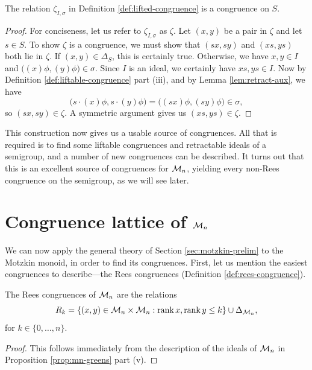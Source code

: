 \begin{theorem}
  \label{thm:lifted-congruence}
  The relation $\zeta_{I,\sigma}$ in Definition \ref{def:lifted-congruence} is a
  congruence on $S$.
  \begin{proof}
    For conciseness, let us refer to $\zeta_{I,\sigma}$ as $\zeta$.  Let $(x,y)$
    be a pair in $\zeta$ and let $s \in S$.  To show $\zeta$ is a congruence, we
    must show that $(sx,sy)$ and $(xs,ys)$ both lie in $\zeta$.  If
    $(x,y) \in \Delta_S$, this is certainly true.  Otherwise, we have
    $x, y \in I$ and $\big((x)\phi, (y)\phi\big) \in \sigma$.  Since $I$ is an
    ideal, we certainly have $xs,ys\in I$.  Now by Definition
    \ref{def:liftable-congruence} part (iii), and by Lemma
    \ref{lem:retract-aux}, we have
    $$\big(s \cdot (x)\phi, s \cdot (y)\phi\big)
    = \big((sx)\phi, (sy)\phi\big) \in \sigma,$$
    so $(sx, sy) \in \zeta$.  A symmetric argument gives us $(xs,ys) \in \zeta$.
  \end{proof}
\end{theorem}

This construction now gives us a usable source of congruences.  All that is
required is to find some liftable congruences and retractable ideals of a
semigroup, and a number of new congruences can be described.  It turns out that
this is an excellent source of congruences for $\mathcal{M}_n$, yielding every non-Rees
congruence on the semigroup, as we will see later.

\section{Congruence lattice of $\mathcal{M}_n$}
\label{sec:motzkin-congs}


We can now apply the general theory of Section \ref{sec:motzkin-prelim} to the
Motzkin monoid, in order to find its congruences.  First, let us mention the
easiest congruences to describe---the Rees congruences (Definition
\ref{def:rees-congruence}).

\begin{proposition}
  \label{prop:motzkin-rees}
  The Rees congruences of $\mathcal{M}_n$ are the relations
  $$R_k = \{(x,y) \in \mathcal{M}_n \times \mathcal{M}_n : \operatorname{rank} x, \operatorname{rank} y \leq k\} \cup
  \Delta_{\mathcal{M}_n},$$
  for $k \in \{0, \ldots, n\}$.
  \begin{proof}
    This follows immediately from the description of the ideals of $\mathcal{M}_n$ in
    Proposition \ref{prop:mn-greens} part (v).
  \end{proof}
\end{proposition}

